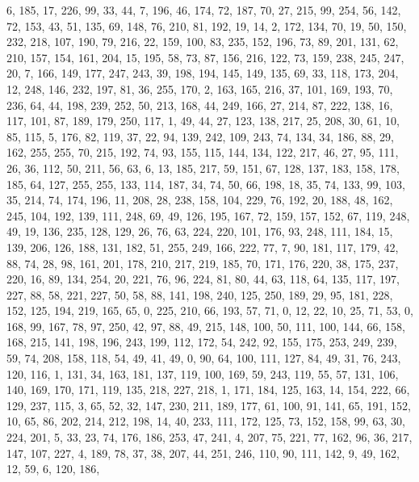 \begin{DoxyCode}
       6, 185, 17, 226, 99, 33, 44, 7, 196, 46, 174, 72, 187, 70, 27, 215, 99, 254, 56, 142, 72, 153, 43, 51, 135,
       69, 148, 76, 210, 81, 192, 19, 14, 2, 172, 134, 70, 19, 50, 150, 232, 218, 107, 190, 79, 216, 22, 159, 100,
       83, 235, 152, 196, 73, 89, 201, 131, 62, 210, 157, 154, 161, 204, 15, 195, 58, 73, 87, 156, 216, 122, 73,
       159, 238, 245, 247, 20, 7, 166, 149, 177, 247, 243, 39, 198, 194, 145, 149, 135, 69, 33, 118, 173, 204, 12,
       248, 146, 232, 197, 81, 36, 255, 170, 2, 163, 165, 216, 37, 101, 169, 193, 70, 236, 64, 44, 198, 239, 252, 50,
       213, 168, 44, 249, 166, 27, 214, 87, 222, 138, 16, 117, 101, 87, 189, 179, 250, 117, 1, 49, 44, 27, 123,
       138, 217, 25, 208, 30, 61, 10, 85, 115, 5, 176, 82, 119, 37, 22, 94, 139, 242, 109, 243, 74, 134, 34, 186, 88,
       29, 162, 255, 255, 70, 215, 192, 74, 93, 155, 115, 144, 134, 122, 217, 46, 27, 95, 111, 26, 36, 112, 50,
       211, 56, 63, 6, 13, 185, 217, 59, 151, 67, 128, 137, 183, 158, 178, 185, 64, 127, 255, 255, 133, 114, 187, 34,
       74, 50, 66, 198, 18, 35, 74, 133, 99, 103, 35, 214, 74, 174, 196, 11, 208, 28, 238, 158, 104, 229, 76, 192,
       20, 188, 48, 162, 245, 104, 192, 139, 111, 248, 69, 49, 126, 195, 167, 72, 159, 157, 152, 67, 119, 248, 49,
       19, 136, 235, 128, 129, 26, 76, 63, 224, 220, 101, 176, 93, 248, 111, 184, 15, 139, 206, 126, 188, 131, 182,
       51, 255, 249, 166, 222, 77, 7, 90, 181, 117, 179, 42, 88, 74, 28, 98, 161, 201, 178, 210, 217, 219, 185,
       70, 171, 176, 220, 38, 175, 237, 220, 16, 89, 134, 254, 20, 221, 76, 96, 224, 81, 80, 44, 63, 118, 64, 135,
       117, 197, 227, 88, 58, 221, 227, 50, 58, 88, 141, 198, 240, 125, 250, 189, 29, 95, 181, 228, 152, 125, 194,
       219, 165, 65, 0, 225, 210, 66, 193, 57, 71, 0, 12, 22, 10, 25, 71, 53, 0, 168, 99, 167, 78, 97, 250, 42, 97,
       88, 49, 215, 148, 100, 50, 111, 100, 144, 66, 158, 168, 215, 141, 198, 196, 243, 199, 112, 172, 54, 242, 92,
       155, 175, 253, 249, 239, 59, 74, 208, 158, 118, 54, 49, 41, 49, 0, 90, 64, 100, 111, 127, 84, 49, 31, 76,
       243, 120, 116, 1, 131, 34, 163, 181, 137, 119, 100, 169, 59, 243, 119, 55, 57, 131, 106, 140, 169, 170, 171,
       119, 135, 218, 227, 218, 1, 171, 184, 125, 163, 14, 154, 222, 66, 129, 237, 115, 3, 65, 52, 32, 147, 230,
       211, 189, 177, 61, 100, 91, 141, 65, 191, 152, 10, 65, 86, 202, 214, 212, 198, 14, 40, 233, 111, 172, 125, 73,
       152, 158, 99, 63, 30, 224, 201, 5, 33, 23, 74, 176, 186, 253, 47, 241, 4, 207, 75, 221, 77, 162, 96, 36,
       217, 147, 107, 227, 4, 189, 78, 37, 38, 207, 44, 251, 246, 110, 90, 111, 142, 9, 49, 162, 12, 59, 6, 120, 186,

\end{DoxyCode}

